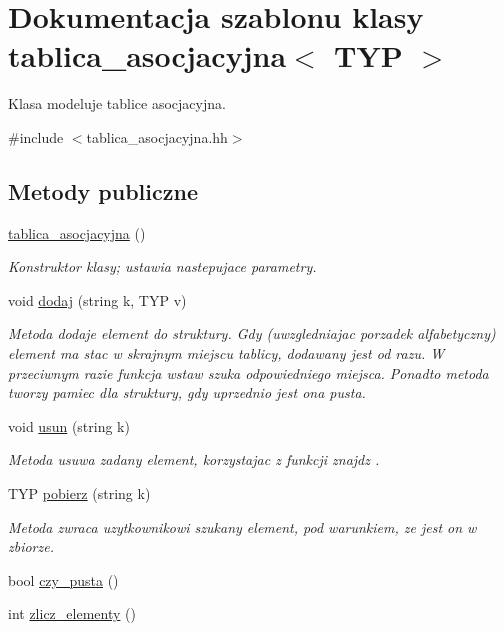 \hypertarget{classtablica__asocjacyjna}{\section{\-Dokumentacja szablonu klasy tablica\-\_\-asocjacyjna$<$ \-T\-Y\-P $>$}
\label{classtablica__asocjacyjna}
}


\-Klasa modeluje tablice asocjacyjna.  




{\ttfamily \#include $<$tablica\-\_\-asocjacyjna.\-hh$>$}

\subsection*{\-Metody publiczne}
\begin{DoxyCompactItemize}
\item 
\hyperlink{classtablica__asocjacyjna_a9173f2b75f1933696247580da5e5c103}{tablica\-\_\-asocjacyjna} ()
\begin{DoxyCompactList}\small\item\em \-Konstruktor klasy; ustawia nastepujace parametry. \end{DoxyCompactList}\item 
void \hyperlink{classtablica__asocjacyjna_afab8557bd095ee1ba1756a5a195f8ca7}{dodaj} (string k, \-T\-Y\-P v)
\begin{DoxyCompactList}\small\item\em \-Metoda dodaje element do struktury. \-Gdy (uwzgledniajac porzadek alfabetyczny) element ma stac w skrajnym miejscu tablicy, dodawany jest od razu. \-W przeciwnym razie funkcja {\ttfamily wstaw} {\ttfamily szuka} odpowiedniego miejsca. \-Ponadto metoda tworzy pamiec dla struktury, gdy uprzednio jest ona pusta. \end{DoxyCompactList}\item 
void \hyperlink{classtablica__asocjacyjna_ae0d1ac59cdc7a7dd220672a246a7d8ad}{usun} (string k)
\begin{DoxyCompactList}\small\item\em \-Metoda usuwa zadany element, korzystajac z funkcji {\ttfamily znajdz} {\ttfamily }. \end{DoxyCompactList}\item 
\-T\-Y\-P \hyperlink{classtablica__asocjacyjna_a45b52661ed6e20e64a686fb55d9aa2f9}{pobierz} (string k)
\begin{DoxyCompactList}\small\item\em \-Metoda zwraca uzytkownikowi szukany element, pod warunkiem, ze jest on w zbiorze. \end{DoxyCompactList}\item 
bool \hyperlink{classtablica__asocjacyjna_a671f1d928a4d91c6e7708a55b1ce85dc}{czy\-\_\-pusta} ()
\item 
int \hyperlink{classtablica__asocjacyjna_a103aa115af24abf1d08c56e14c87b249}{zlicz\-\_\-elementy} ()
\end{DoxyCompactItemize}
